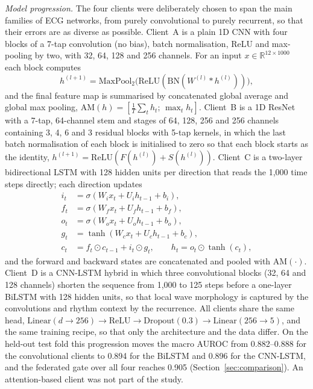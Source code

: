 \textit{Model progression.} The four clients were deliberately chosen to span the main families of
ECG networks, from purely convolutional to purely recurrent, so that their errors are as diverse as
possible. Client~A is a plain 1D CNN with four blocks of a 7-tap convolution (no bias), batch
normalisation, ReLU and max-pooling by two, with 32, 64, 128 and 256 channels. For an input
$x\in\mathbb{R}^{12\times 1000}$ each block computes
\begin{equation}
  h^{(l+1)} = \mathrm{MaxPool}_2\big(\mathrm{ReLU}(\mathrm{BN}(W^{(l)} * h^{(l)}))\big),
\end{equation}
and the final feature map is summarised by concatenated global average and global max pooling,
$\mathrm{AM}(h)=[\tfrac{1}{T}\sum_t h_t;\,\max_t h_t]$. Client~B is a 1D ResNet \cite{he2016resnet}
with a 7-tap, 64-channel stem and stages of 64, 128, 256 and 256 channels containing 3, 4, 6 and 3
residual blocks with 5-tap kernels, in which the last batch normalisation of each block is
initialised to zero so that each block starts as the identity, $h^{(l+1)}=\mathrm{ReLU}(F(h^{(l)})+S(h^{(l)}))$.
Client~C is a two-layer bidirectional LSTM \cite{hochreiter1997lstm,schuster1997bilstm} with 128
hidden units per direction that reads the 1,000 time steps directly; each direction updates
\begin{align}
  i_t &= \sigma(W_i x_t + U_i h_{t-1} + b_i), \nonumber\\
  f_t &= \sigma(W_f x_t + U_f h_{t-1} + b_f), \nonumber\\
  o_t &= \sigma(W_o x_t + U_o h_{t-1} + b_o), \nonumber\\
  g_t &= \tanh(W_c x_t + U_c h_{t-1} + b_c), \nonumber\\
  c_t &= f_t\odot c_{t-1} + i_t\odot g_t, \qquad h_t = o_t\odot\tanh(c_t),
\end{align}
and the forward and backward states are concatenated and pooled with $\mathrm{AM}(\cdot)$. Client~D is
a CNN-LSTM hybrid in which three convolutional blocks (32, 64 and 128 channels) shorten the sequence
from 1,000 to 125 steps before a one-layer BiLSTM with 128 hidden units, so that local wave
morphology is captured by the convolutions and rhythm context by the recurrence. All clients share
the same head, $\mathrm{Linear}(d\!\rightarrow\!256)\!\rightarrow\!\mathrm{ReLU}\!\rightarrow\!
\mathrm{Dropout}(0.3)\!\rightarrow\!\mathrm{Linear}(256\!\rightarrow\!5)$, and the same training
recipe, so that only the architecture and the data differ. On the held-out test fold this
progression moves the macro AUROC from 0.882--0.888 for the convolutional clients to 0.894 for the
BiLSTM and 0.896 for the CNN-LSTM, and the federated gate over all four reaches 0.905
(Section~\ref{sec:comparison}). An attention-based client was not part of the study.

